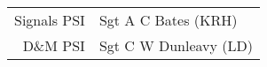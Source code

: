 \begin{center}
  \small
  \begin{tabular}{rl}
    Signals PSI & Sgt A C Bates (KRH) \\
    D\&M PSI & Sgt C W Dunleavy (LD) \\
  \end{tabular}
\end{center}
